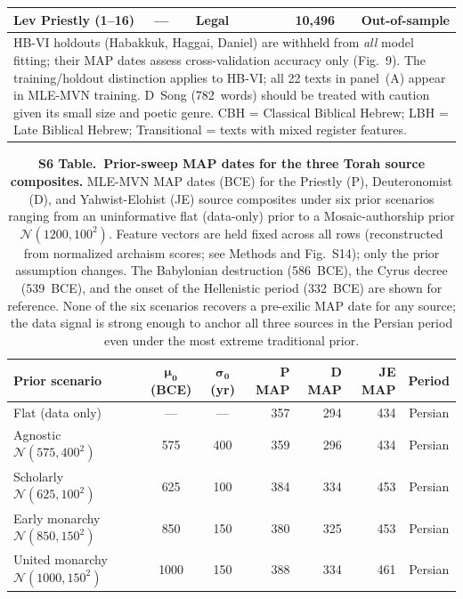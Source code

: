 \documentclass[10pt,letterpaper]{article}
\begin{document}
\begin{table}[!ht]
\begin{tabular}{lllrr}
  Lev Priestly (1--16)                   & ---              & Legal        &  10,496 & Out-of-sample \\
\hline
\multicolumn{5}{p{14cm}}{\small HB-VI holdouts (Habakkuk, Haggai, Daniel) are withheld
from \emph{all} model fitting; their MAP dates assess cross-validation accuracy only
(Fig.~9).  The training/holdout distinction applies to HB-VI; all 22 texts in panel~(A)
appear in MLE-MVN training.  D~Song (782~words) should be treated with caution given its
small size and poetic genre.  CBH = Classical Biblical Hebrew;
LBH = Late Biblical Hebrew; Transitional = texts with mixed register features.} \\
\end{tabular}
\end{table}

\begin{table}[!ht]
\caption{\textbf{S6 Table.\ Prior-sweep MAP dates for the three Torah source composites.}
MLE-MVN MAP dates (BCE) for the Priestly (P), Deuteronomist (D), and Yahwist-Elohist (JE)
source composites under six prior scenarios ranging from an uninformative flat (data-only)
prior to a Mosaic-authorship prior $\mathcal{N}(1200,100^2)$.  Feature vectors are held
fixed across all rows (reconstructed from normalized archaism scores; see Methods and
Fig.~S14); only the prior assumption changes.  The Babylonian destruction (586~BCE),
the Cyrus decree (539~BCE), and the onset of the Hellenistic period (332~BCE) are shown
for reference.  None of the six scenarios recovers a pre-exilic MAP date for any source;
the data signal is strong enough to anchor all three sources in the Persian period even
under the most extreme traditional prior.}
\label{tab:s6_prior_sweep}
\begin{tabular}{lccrrrc}
\hline
\textbf{Prior scenario} &
$\boldsymbol{\mu_0}$ (BCE) & $\boldsymbol{\sigma_0}$ (yr) &
\textbf{P MAP} & \textbf{D MAP} & \textbf{JE MAP} & \textbf{Period} \\
\hline
Flat (data only)
  & --- & --- & 357 & 294 & 434 & Persian \\
Agnostic $\mathcal{N}(575,400^2)$
  & 575 & 400 & 359 & 296 & 434 & Persian \\
Scholarly $\mathcal{N}(625,100^2)$
  & 625 & 100 & 384 & 334 & 453 & Persian \\
Early monarchy $\mathcal{N}(850,150^2)$
  & 850 & 150 & 380 & 325 & 453 & Persian \\
United monarchy $\mathcal{N}(1000,150^2)$
  & 1000 & 150 & 388 & 334 & 461 & Persian \\

\end{tabular}
\end{table}
\end{document}
